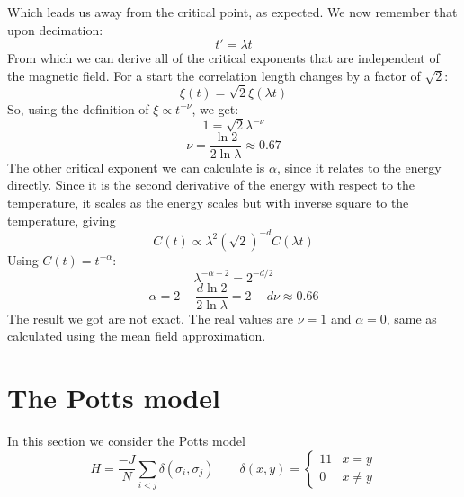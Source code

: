 \documentclass{article}
\begin{document}
Which leads us away from the critical point, as expected. We now remember that upon decimation:
\begin{equation}
    t' = \lambda t
\end{equation}
From which we can derive all of the critical exponents that are independent of the magnetic field.
For a start the correlation length changes by a factor of $\sqrt{2}$:
\begin{equation}
    \xi(t) = \sqrt{2}\xi(\lambda t)
\end{equation}
So, using the definition of $\xi \propto t^{-\nu}$, we get:
\begin{equation}
    1 = \sqrt{2}\lambda^{-\nu}
\end{equation}
\begin{equation}
    \nu = \frac{\ln 2}{2\ln \lambda} \approx 0.67
\end{equation}
The other critical exponent we can calculate is $\alpha$, since it relates to the energy directly. Since it is the second derivative of the energy with respect to the temperature, it scales as the energy scales but with inverse square to the temperature, giving
\begin{equation}
    C(t) \propto \lambda^2\left(\sqrt{2}\right)^{-d} C(\lambda t)
\end{equation}
Using $C(t) = t^{-\alpha}$:
\begin{equation}
    \lambda^{-\alpha + 2} =  2^{-d/2}
\end{equation}
\begin{equation}
    \alpha = 2 - \frac{d\ln 2}{2\ln \lambda} = 2 - d\nu \approx 0.66
\end{equation}
The result we got are not exact. The real values are $\nu = 1$ and $\alpha = 0$, same as calculated using the mean field approximation.

\section{The Potts model}
In this section we consider the Potts model
\begin{equation}
    H = \frac{-J}{N} \sum_{i < j} \delta(\sigma_i, \sigma_j)
    \qquad
    \delta(x, y) = \begin{cases}1
        1 & x = y \\ 0 & x \ne y
    \end{cases}
\end{equation}
\end{document}
